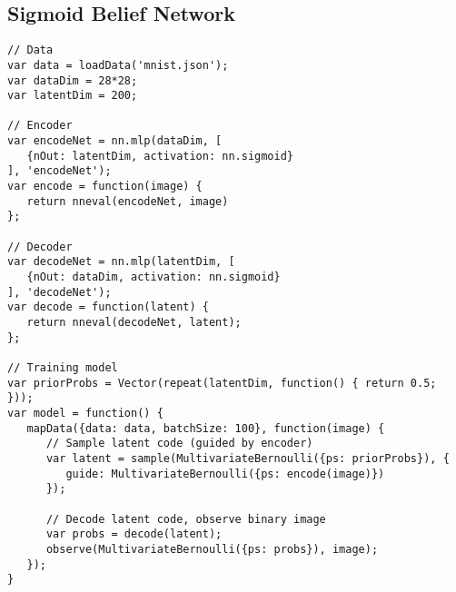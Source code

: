 \subsection{Sigmoid Belief Network}
\label{sec:appendix_code:sbn}

\begin{lstlisting}
// Data
var data = loadData('mnist.json');
var dataDim = 28*28;
var latentDim = 200;

// Encoder
var encodeNet = nn.mlp(dataDim, [
   {nOut: latentDim, activation: nn.sigmoid}
], 'encodeNet');
var encode = function(image) {
   return nneval(encodeNet, image)
};

// Decoder
var decodeNet = nn.mlp(latentDim, [
   {nOut: dataDim, activation: nn.sigmoid}
], 'decodeNet');
var decode = function(latent) {
   return nneval(decodeNet, latent);
};

// Training model
var priorProbs = Vector(repeat(latentDim, function() { return 0.5; }));
var model = function() {
   mapData({data: data, batchSize: 100}, function(image) {
      // Sample latent code (guided by encoder)
      var latent = sample(MultivariateBernoulli({ps: priorProbs}), {
         guide: MultivariateBernoulli({ps: encode(image)})
      });

      // Decode latent code, observe binary image
      var probs = decode(latent);
      observe(MultivariateBernoulli({ps: probs}), image);
   });
}
\end{lstlisting}
